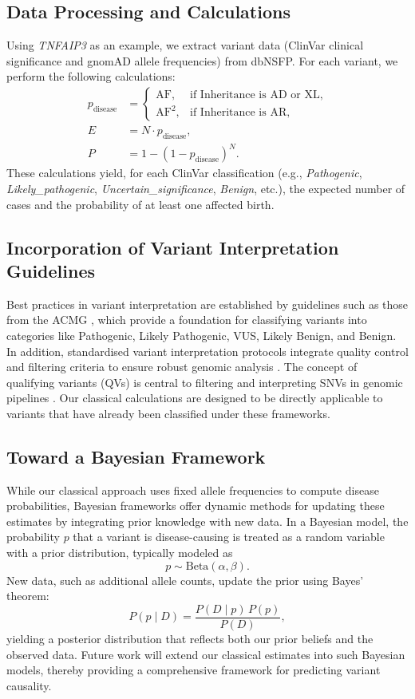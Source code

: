 \documentclass[a4paper,12pt]{article}
\begin{document}
\subsection{Data Processing and Calculations}
Using \textit{TNFAIP3} as an example, we extract variant data (ClinVar clinical significance and gnomAD allele frequencies) from dbNSFP. For each variant, we perform the following calculations:
\begin{align*}
p_{\text{disease}} &= 
\begin{cases}
\text{AF}, & \text{if Inheritance is AD or XL},\\[1mm]
\text{AF}^2, & \text{if Inheritance is AR},
\end{cases}\\[1mm]
E &= N \cdot p_{\text{disease}},\\[1mm]
P &= 1 - (1 - p_{\text{disease}})^N.
\end{align*}
These calculations yield, for each ClinVar classification (e.g., \textit{Pathogenic}, \textit{Likely\_pathogenic}, \textit{Uncertain\_significance}, \textit{Benign}, etc.), the expected number of cases and the probability of at least one affected birth.

\subsection{Incorporation of Variant Interpretation Guidelines}
Best practices in variant interpretation are established by guidelines such as those from the ACMG \citep{richards2015standards}, which provide a foundation for classifying variants into categories like Pathogenic, Likely Pathogenic, VUS, Likely Benign, and Benign. In addition, standardised variant interpretation protocols integrate quality control and filtering criteria to ensure robust genomic analysis \citep{pedersen2021effective,anderson2010data}. The concept of qualifying variants (QVs) is central to filtering and interpreting SNVs in genomic pipelines \citep{cirulli2015exome,tavtigian2020fitting}. Our classical calculations are designed to be directly applicable to variants that have already been classified under these frameworks.

\subsection{Toward a Bayesian Framework}
While our classical approach uses fixed allele frequencies to compute disease probabilities, Bayesian frameworks offer dynamic methods for updating these estimates by integrating prior knowledge with new data. In a Bayesian model, the probability $p$ that a variant is disease-causing is treated as a random variable with a prior distribution, typically modeled as
\[
p \sim \text{Beta}(\alpha, \beta).
\]
New data, such as additional allele counts, update the prior using Bayes' theorem:
\[
P(p \mid D) = \frac{P(D \mid p) \, P(p)}{P(D)},
\]
yielding a posterior distribution that reflects both our prior beliefs and the observed data. Future work will extend our classical estimates into such Bayesian models, thereby providing a comprehensive framework for predicting variant causality.
\end{document}

